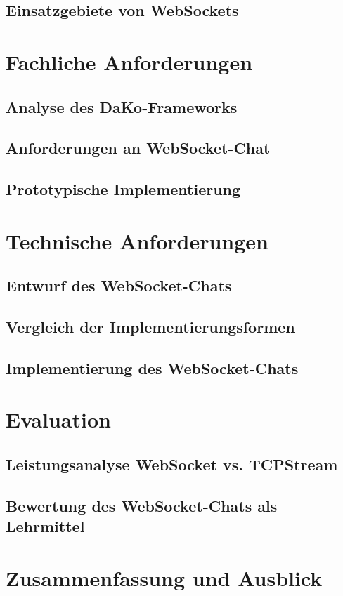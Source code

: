\documentclass[11pt,a4paper,titlepage]{scrartcl}
\numberwithin{equation}{section}
\begin{document}
\subsection{Einsatzgebiete von WebSockets}

\section{Fachliche Anforderungen}
\subsection{Analyse des DaKo-Frameworks}
\subsection{Anforderungen an WebSocket-Chat}
\subsection{Prototypische Implementierung}

\section{Technische Anforderungen}
\subsection{Entwurf des WebSocket-Chats}
\subsection{Vergleich der Implementierungsformen}
\subsection{Implementierung des WebSocket-Chats}

\section{Evaluation}
\subsection{Leistungsanalyse WebSocket vs. TCPStream}
\subsection{Bewertung des WebSocket-Chats als Lehrmittel}

\section{Zusammenfassung und Ausblick}



\end{document}
